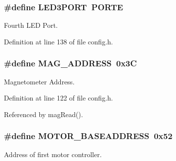 \hypertarget{group__config_ga63df95c1a0ce0e770964ca35e4032fb6}{
\subsubsection[{L\-E\-D3\-P\-O\-R\-T}]{\setlength{\rightskip}{0pt plus 5cm}\#define L\-E\-D3\-P\-O\-R\-T~P\-O\-R\-T\-E}}\label{group__config_ga63df95c1a0ce0e770964ca35e4032fb6}


Fourth L\-E\-D Port. 



Definition at line 138 of file config.\-h.

\hypertarget{group__config_gade4e63fac819c67040e374f08d2d7230}{
\subsubsection[{M\-A\-G\-\_\-\-A\-D\-D\-R\-E\-S\-S}]{\setlength{\rightskip}{0pt plus 5cm}\#define M\-A\-G\-\_\-\-A\-D\-D\-R\-E\-S\-S~0x3\-C}}\label{group__config_gade4e63fac819c67040e374f08d2d7230}


Magnetometer Address. 



Definition at line 122 of file config.\-h.



Referenced by mag\-Read().

\hypertarget{group__config_ga6e8ab18bbb1ef1b1e929c627f18224a3}{
\subsubsection[{M\-O\-T\-O\-R\-\_\-\-B\-A\-S\-E\-A\-D\-D\-R\-E\-S\-S}]{\setlength{\rightskip}{0pt plus 5cm}\#define M\-O\-T\-O\-R\-\_\-\-B\-A\-S\-E\-A\-D\-D\-R\-E\-S\-S~0x52}}\label{group__config_ga6e8ab18bbb1ef1b1e929c627f18224a3}


Address of first motor controller. 




